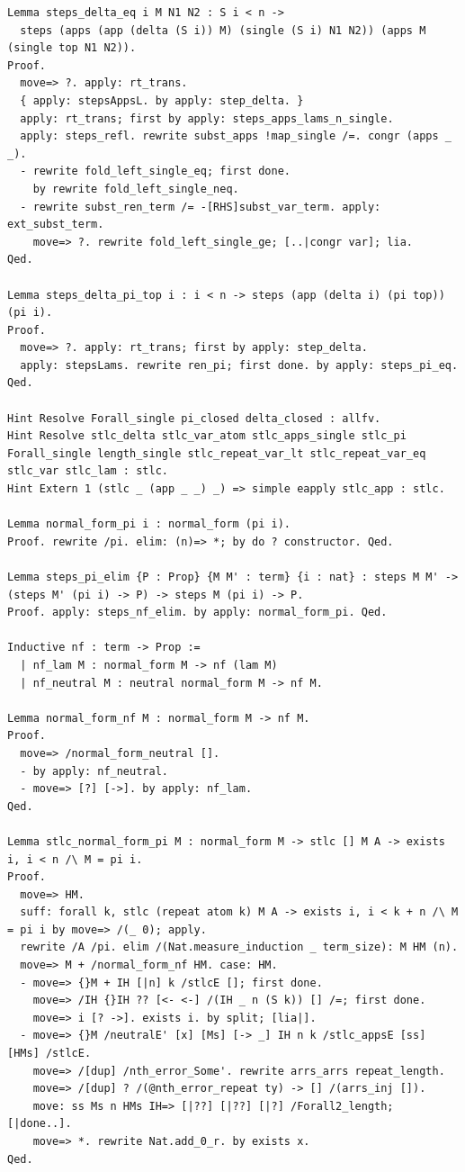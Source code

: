 \begin{lstlisting}
Lemma steps_delta_eq i M N1 N2 : S i < n ->
  steps (apps (app (delta (S i)) M) (single (S i) N1 N2)) (apps M (single top N1 N2)).
Proof.
  move=> ?. apply: rt_trans.
  { apply: stepsAppsL. by apply: step_delta. }
  apply: rt_trans; first by apply: steps_apps_lams_n_single.
  apply: steps_refl. rewrite subst_apps !map_single /=. congr (apps _ _).
  - rewrite fold_left_single_eq; first done.
    by rewrite fold_left_single_neq.
  - rewrite subst_ren_term /= -[RHS]subst_var_term. apply: ext_subst_term.
    move=> ?. rewrite fold_left_single_ge; [..|congr var]; lia.
Qed.

Lemma steps_delta_pi_top i : i < n -> steps (app (delta i) (pi top)) (pi i).
Proof.
  move=> ?. apply: rt_trans; first by apply: step_delta.
  apply: stepsLams. rewrite ren_pi; first done. by apply: steps_pi_eq.
Qed.

Hint Resolve Forall_single pi_closed delta_closed : allfv.
Hint Resolve stlc_delta stlc_var_atom stlc_apps_single stlc_pi Forall_single length_single stlc_repeat_var_lt stlc_repeat_var_eq stlc_var stlc_lam : stlc.
Hint Extern 1 (stlc _ (app _ _) _) => simple eapply stlc_app : stlc.

Lemma normal_form_pi i : normal_form (pi i).
Proof. rewrite /pi. elim: (n)=> *; by do ? constructor. Qed.

Lemma steps_pi_elim {P : Prop} {M M' : term} {i : nat} : steps M M' -> (steps M' (pi i) -> P) -> steps M (pi i) -> P.
Proof. apply: steps_nf_elim. by apply: normal_form_pi. Qed.

Inductive nf : term -> Prop :=
  | nf_lam M : normal_form M -> nf (lam M)
  | nf_neutral M : neutral normal_form M -> nf M.

Lemma normal_form_nf M : normal_form M -> nf M.
Proof.
  move=> /normal_form_neutral [].
  - by apply: nf_neutral.
  - move=> [?] [->]. by apply: nf_lam.
Qed.

Lemma stlc_normal_form_pi M : normal_form M -> stlc [] M A -> exists i, i < n /\ M = pi i.
Proof.
  move=> HM.
  suff: forall k, stlc (repeat atom k) M A -> exists i, i < k + n /\ M = pi i by move=> /(_ 0); apply.
  rewrite /A /pi. elim /(Nat.measure_induction _ term_size): M HM (n).
  move=> M + /normal_form_nf HM. case: HM.
  - move=> {}M + IH [|n] k /stlcE []; first done.
    move=> /IH {}IH ?? [<- <-] /(IH _ n (S k)) [] /=; first done.
    move=> i [? ->]. exists i. by split; [lia|].
  - move=> {}M /neutralE' [x] [Ms] [-> _] IH n k /stlc_appsE [ss] [HMs] /stlcE.
    move=> /[dup] /nth_error_Some'. rewrite arrs_arrs repeat_length.
    move=> /[dup] ? /(@nth_error_repeat ty) -> [] /(arrs_inj []).
    move: ss Ms n HMs IH=> [|??] [|??] [|?] /Forall2_length; [|done..].
    move=> *. rewrite Nat.add_0_r. by exists x.
Qed.


\end{lstlisting}
